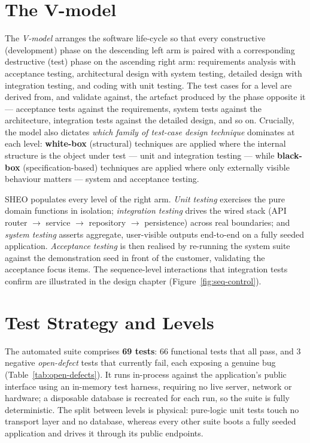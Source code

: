 \section{The V-model}
\label{sec:qa-vmodel}

The \emph{V-model} arranges the software life-cycle so that every constructive
(development) phase on the descending left arm is paired with a corresponding
destructive (test) phase on the ascending right arm: requirements analysis with
acceptance testing, architectural design with system testing, detailed design with
integration testing, and coding with unit testing. The test cases for a level are
derived from, and validate against, the artefact produced by the phase opposite it ---
acceptance tests against the requirements, system tests against the architecture,
integration tests against the detailed design, and so on. Crucially, the model also
dictates \emph{which family of test-case design technique} dominates at each level:
\textbf{white-box} (structural) techniques are applied where the internal structure
is the object under test --- unit and integration testing --- while \textbf{black-box}
(specification-based) techniques are applied where only externally visible behaviour
matters --- system and acceptance testing.

SHEO populates every level of the right arm. \emph{Unit testing} exercises the
pure domain functions in isolation; \emph{integration testing} drives the wired
stack (API router $\rightarrow$ service $\rightarrow$ repository $\rightarrow$
persistence) across real boundaries; and \emph{system testing} asserts aggregate,
user-visible outputs end-to-end on a fully seeded application. \emph{Acceptance
testing} is then realised by re-running the system suite against the demonstration
seed in front of the customer, validating the acceptance focus items.
The sequence-level interactions that integration tests confirm are illustrated in
the design chapter (Figure~\ref{fig:seq-control}).

\section{Test Strategy and Levels}
\label{sec:qa-strategy}

The automated suite comprises \textbf{69 tests}: 66 functional tests that all pass,
and 3 negative \emph{open-defect} tests that currently fail, each exposing a genuine
bug (Table~\ref{tab:open-defects}). It runs in-process against the
application's public interface using an in-memory test harness, requiring no live
server, network or hardware; a disposable database is recreated for each run, so
the suite is fully deterministic. The split between levels is physical: pure-logic
unit tests touch no transport layer and no database, whereas every other suite
boots a fully seeded application and drives it through its public endpoints.

